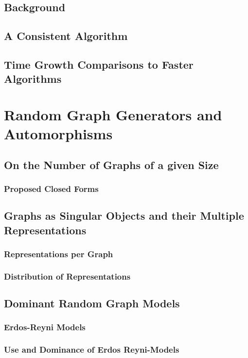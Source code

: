 \documentclass[11pt,a4paper]{report}
\begin{document}
\section{Background}
\section{A Consistent Algorithm}
\section{Time Growth Comparisons to Faster Algorithms}



\chapter{Random Graph Generators and Automorphisms}

\section{On the Number of Graphs of a given Size}
\subsection{Proposed Closed Forms}

\section{Graphs as Singular Objects and their Multiple Representations}
\subsection{Representations per Graph}
\subsection{Distribution of Representations}

\section{Dominant Random Graph Models}
\subsection{Erdos-Reyni Models}
\subsection{Use and Dominance of Erdos Reyni-Models}
\end{document}
